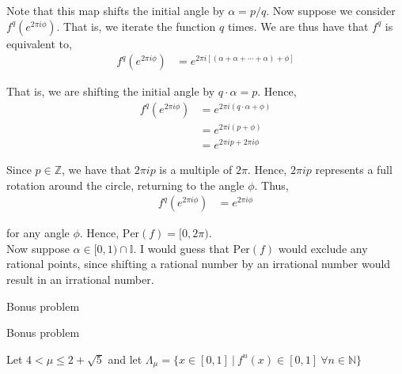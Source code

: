\documentclass[12pt]{article}
\newenvironment{problem}[2][Problem]{\begin{trivlist}
\item[\hskip \labelsep {\bfseries #1}\hskip \labelsep {\bfseries #2.}]}{\end{trivlist}}
\begin{document}
Note that this map shifts the initial angle by $\alpha = p/q$. Now suppose we consider $f^q(e^{2\pi i \phi})$. That is, we iterate the function $q$ times. We are thus have that $f^q$ is equivalent to,
\begin{align*}
f^q(e^{2\pi i \phi}) &= e^{2\pi i[(\alpha + \alpha + \cdots + \alpha) + \phi]}
\end{align*} 

That is, we are shifting the initial angle by $q \cdot \alpha = p$. Hence,
\begin{align*}
f^q(e^{2\pi i \phi}) &= e^{2\pi i (q \cdot \alpha + \phi)}\\
&= e^{2\pi i (p + \phi)}\\
&= e^{2\pi i p + 2\pi i \phi}
\end{align*}

Since $p \in \mathbb{Z}$, we have that $2 \pi i p$ is a multiple of $2\pi$. Hence, $2\pi i p$ represents a full rotation around the circle, returning to the angle $\phi$. Thus,
\begin{align*}
f^q(e^{2\pi i \phi}) &= e^{2\pi i \phi}
\end{align*}

for any angle $\phi$. Hence, $\text{Per}(f) = [0, 2\pi)$.\\

Now suppose $\alpha \in [0, 1) \cap \mathbb{I}$. I would guess that $\text{Per}(f)$ would exclude any rational points, since shifting a rational number by an irrational number would result in an irrational number.

\begin{problem}{4}
Bonus problem
\end{problem}

\begin{problem}{5}
Bonus problem
\end{problem}

Let $4 < \mu \leq 2 + \sqrt{5}$ and let $\Lambda_{\mu} = \{x \in [0, 1] \ | \ f^n(x) \in [0, 1] \ \forall n \in \mathbb{N}\}$
\end{document}
